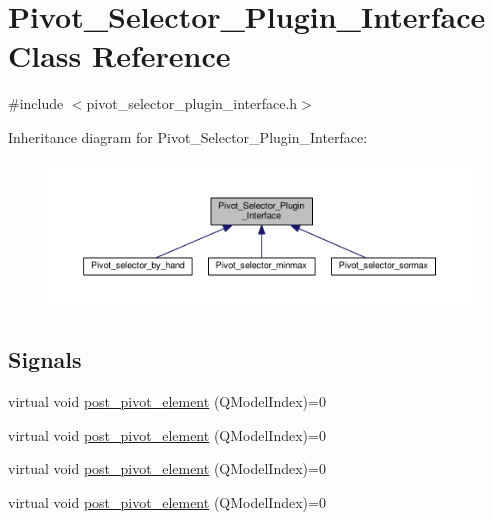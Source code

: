 \hypertarget{classPivot__Selector__Plugin__Interface}{}\section{Pivot\+\_\+\+Selector\+\_\+\+Plugin\+\_\+\+Interface Class Reference}
\label{classPivot__Selector__Plugin__Interface}


{\ttfamily \#include $<$pivot\+\_\+selector\+\_\+plugin\+\_\+interface.\+h$>$}



Inheritance diagram for Pivot\+\_\+\+Selector\+\_\+\+Plugin\+\_\+\+Interface\+:\nopagebreak
\begin{figure}[H]
\begin{center}
\leavevmode
\includegraphics[width=350pt]{classPivot__Selector__Plugin__Interface__inherit__graph}
\end{center}
\end{figure}
\subsection*{Signals}
\begin{DoxyCompactItemize}
\item 
virtual void \hyperlink{classPivot__Selector__Plugin__Interface_ac0451363b035e9e0b5ae571ce671f667}{post\+\_\+pivot\+\_\+element} (Q\+Model\+Index)=0
\item 
virtual void \hyperlink{classPivot__Selector__Plugin__Interface_ac0451363b035e9e0b5ae571ce671f667}{post\+\_\+pivot\+\_\+element} (Q\+Model\+Index)=0
\item 
virtual void \hyperlink{classPivot__Selector__Plugin__Interface_ac0451363b035e9e0b5ae571ce671f667}{post\+\_\+pivot\+\_\+element} (Q\+Model\+Index)=0
\item 
virtual void \hyperlink{classPivot__Selector__Plugin__Interface_ac0451363b035e9e0b5ae571ce671f667}{post\+\_\+pivot\+\_\+element} (Q\+Model\+Index)=0
\end{DoxyCompactItemize}
